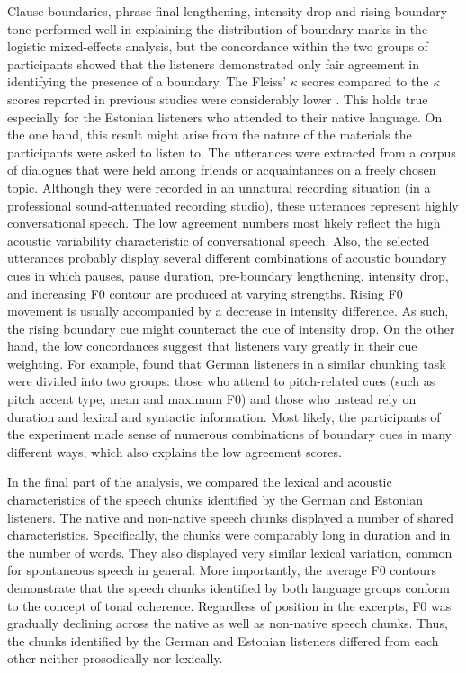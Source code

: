 \documentclass[output=paper]{langscibook}
\begin{document}
    Clause boundaries, phrase-final lengthening, intensity drop and rising boundary tone performed well in explaining the distribution of boundary marks in the logistic mixed-effects analysis, but the concordance within the two groups of participants showed that the listeners demonstrated only fair agreement in identifying the presence of a boundary. The Fleiss’ $\kappa$ scores compared to the $\kappa$ scores reported in previous studies were considerably lower \citep[see, e.g.,][]{himmelmannEtAl2018, riesbergEtAl2020}. This holds true especially for the Estonian listeners who attended to their native language. On the one hand, this result might arise from the nature of the materials the participants were asked to listen to. The utterances were extracted from a corpus of dialogues that were held among friends or acquaintances on a freely chosen topic. Although they were recorded in an unnatural recording situation (in a professional sound-attenuated recording studio), these utterances represent highly conversational speech. The low agreement numbers most likely reflect the high acoustic variability characteristic of conversational speech. Also, the selected utterances probably display several different combinations of acoustic boundary cues in which pauses, pause duration, pre-boundary lengthening, intensity drop, and increasing F0 contour are produced at varying strengths. Rising F0 movement is usually accompanied by a decrease in intensity difference. As such, the rising boundary cue might counteract the cue of intensity drop. On the other hand, the low concordances suggest that listeners vary greatly in their cue weighting. For example, \citet[][]{baumannWinter2018} found that German listeners in a similar chunking task were divided into two groups: those who attend to pitch-related cues (such as pitch accent type, mean and maximum F0) and those who instead rely on duration and lexical and syntactic information. Most likely, the participants of the experiment made sense of numerous combinations of boundary cues in many different ways, which also explains the low agreement scores.

    In the final part of the analysis, we compared the lexical and acoustic characteristics of the speech chunks identified by the German and Estonian listeners. The native and non-native speech chunks displayed a number of shared characteristics. Specifically, the chunks were comparably long in duration and in the number of words. They also displayed very similar lexical variation, common for spontaneous speech in general. More importantly, the average F0 contours demonstrate that the speech chunks identified by both language groups conform to the concept of tonal coherence. Regardless of position in the excerpts, F0 was gradually declining across the native as well as non-native speech chunks. Thus, the chunks identified by the German and Estonian listeners differed from each other neither prosodically nor lexically.
    
\end{document}
